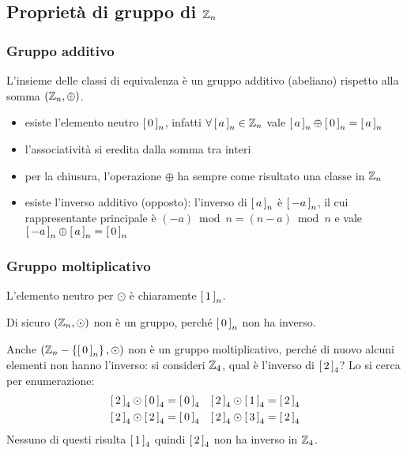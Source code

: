 \subsection{Proprietà di gruppo di $\zz{n}$}

\subsubsection{Gruppo additivo}

L'insieme
delle classi di equivalenza è un gruppo additivo (abeliano)
rispetto alla somma
$
\left( 
    \zz{n}, \oplus
\right)
$.

\begin{itemize}
    \item esiste l'elemento neutro $
        \cln{0}
        $, infatti
        $
        \forall \cln{a} \in \zz{n} 
        $
        vale
        $
        \cln{a} \oplus \cln{0} = \cln{a} 
        $
    \item l'associatività si eredita dalla somma tra interi
    \item per la chiusura, l'operazione $\oplus$ ha sempre come risultato una classe in $\zz{n} $
    \item esiste l'inverso additivo (opposto):
        l'inverso di $
        \cln{a}
        $
        è
        $
        \cln{-a} 
        $,
        il cui rappresentante principale è $
        ( -a ) \bmod n = ( n - a ) \bmod n 
        $ e vale $
        \cln{-a} 
        \oplus 
        \cln{a} 
        =
        \cln{0} 
        $
\end{itemize}

\subsubsection{Gruppo moltiplicativo}

L'elemento neutro per $\odot $ è chiaramente $
\cln{1} 
$.

Di sicuro
$
\left( 
    \zz{n}, \odot
\right)
$
non è un gruppo, perché $
\cln{0} 
$ non ha inverso.

Anche
$
\left( 
    \zz{n} - \left\{ 
        \cln{0} 
    \right\}
    , \odot
\right)
$ non è un gruppo moltiplicativo, perché di nuovo alcuni elementi non hanno l'inverso:
si consideri $
\zz{4}
$, qual è l'inverso di $
\cleq{4}{2}
$? Lo si cerca per enumerazione:
\begin{align*}
    \cleq{4}{2}
    \odot
    \cleq{4}{0}
    &= 
    \cleq{4}{0}
    &
    \cleq{4}{2}
    \odot
    \cleq{4}{1}
    &= 
    \cleq{4}{2}
    \\
    \cleq{4}{2}
    \odot
    \cleq{4}{2}
    &= 
    \cleq{4}{0}
    &
    \cleq{4}{2}
    \odot
    \cleq{4}{3}
    &= 
    \cleq{4}{2}
\end{align*}
Nessuno di questi risulta $
    \cleq{4}{1}
$ quindi $
    \cleq{4}{2}
$ non ha inverso in $
\zz{4}
$.

